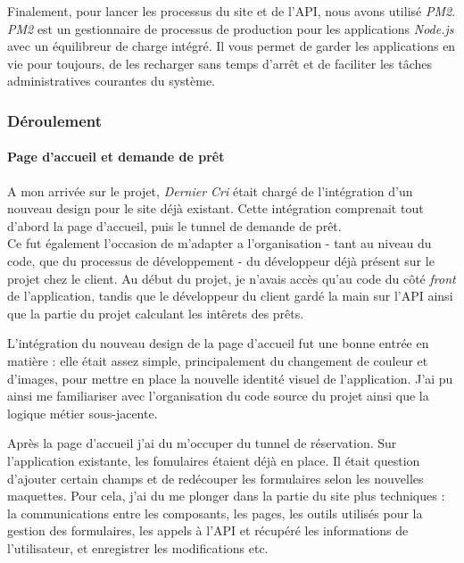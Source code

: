 \bigskip

Finalement, pour lancer les processus du site et de l'API, nous avons
utilisé \emph{PM2}. \emph{PM2} est un gestionnaire de processus de
production pour les applications \emph{Node.js} avec un équilibreur de
charge intégré. Il vous permet de garder les applications en vie pour
toujours, de les recharger sans temps d'arrêt et de faciliter les tâches
administratives courantes du système.

\bigskip

\subsubsection{Déroulement}\label{duxe9roulement-1}

\paragraph{Page d'accueil et demande de
prêt}\label{page-daccueil-et-demande-de-pruxeat}

\bigskip

A mon arrivée sur le projet, \emph{Dernier Cri} était chargé de
l'intégration d'un nouveau design pour le site déjà existant. Cette
intégration comprenait tout d'abord la page d'accueil, puis le tunnel de
demande de prêt.\\
Ce fut également l'occasion de m'adapter a l'organisation - tant au
niveau du code, que du processus de développement - du développeur déjà
présent sur le projet chez le client. Au début du projet, je n'avais
accès qu'au code du côté \emph{front} de l'application, tandis que le
développeur du client gardé la main sur l'API ainsi que la partie du
projet calculant les intêrets des prêts.

\bigskip

L'intégration du nouveau design de la page d'accueil fut une bonne
entrée en matière : elle était assez simple, principalement du
changement de couleur et d'images, pour mettre en place la nouvelle
identité visuel de l'application. J'ai pu ainsi me familiariser avec
l'organisation du code source du projet ainsi que la logique métier
sous-jacente.

\bigskip

Après la page d'accueil j'ai du m'occuper du tunnel de réservation. Sur
l'application existante, les fomulaires étaient déjà en place. Il était
question d'ajouter certain champs et de redécouper les formulaires selon
les nouvelles maquettes. Pour cela, j'ai du me plonger dans la partie du
site plus techniques : la communications entre les composants, les
pages, les outils utilisés pour la gestion des formulaires, les appels à
l'API et récupéré les informations de l'utilisateur, et enregistrer les
modifications etc.

